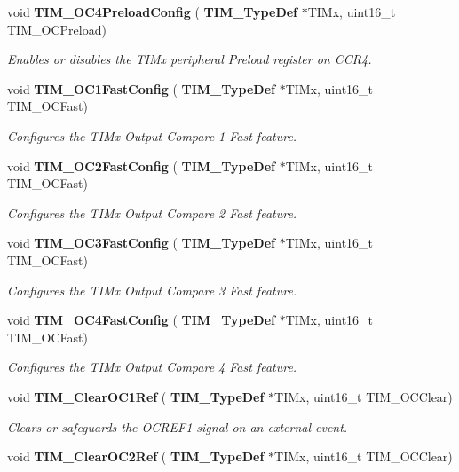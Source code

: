 \begin{DoxyCompactItemize}
void \textbf{ T\+I\+M\+\_\+\+O\+C4\+Preload\+Config} (\textbf{ T\+I\+M\+\_\+\+Type\+Def} $\ast$T\+I\+Mx, uint16\+\_\+t T\+I\+M\+\_\+\+O\+C\+Preload)
\begin{DoxyCompactList}\small\item\em Enables or disables the T\+I\+Mx peripheral Preload register on C\+C\+R4. \end{DoxyCompactList}\item 
void \textbf{ T\+I\+M\+\_\+\+O\+C1\+Fast\+Config} (\textbf{ T\+I\+M\+\_\+\+Type\+Def} $\ast$T\+I\+Mx, uint16\+\_\+t T\+I\+M\+\_\+\+O\+C\+Fast)
\begin{DoxyCompactList}\small\item\em Configures the T\+I\+Mx Output Compare 1 Fast feature. \end{DoxyCompactList}\item 
void \textbf{ T\+I\+M\+\_\+\+O\+C2\+Fast\+Config} (\textbf{ T\+I\+M\+\_\+\+Type\+Def} $\ast$T\+I\+Mx, uint16\+\_\+t T\+I\+M\+\_\+\+O\+C\+Fast)
\begin{DoxyCompactList}\small\item\em Configures the T\+I\+Mx Output Compare 2 Fast feature. \end{DoxyCompactList}\item 
void \textbf{ T\+I\+M\+\_\+\+O\+C3\+Fast\+Config} (\textbf{ T\+I\+M\+\_\+\+Type\+Def} $\ast$T\+I\+Mx, uint16\+\_\+t T\+I\+M\+\_\+\+O\+C\+Fast)
\begin{DoxyCompactList}\small\item\em Configures the T\+I\+Mx Output Compare 3 Fast feature. \end{DoxyCompactList}\item 
void \textbf{ T\+I\+M\+\_\+\+O\+C4\+Fast\+Config} (\textbf{ T\+I\+M\+\_\+\+Type\+Def} $\ast$T\+I\+Mx, uint16\+\_\+t T\+I\+M\+\_\+\+O\+C\+Fast)
\begin{DoxyCompactList}\small\item\em Configures the T\+I\+Mx Output Compare 4 Fast feature. \end{DoxyCompactList}\item 
void \textbf{ T\+I\+M\+\_\+\+Clear\+O\+C1\+Ref} (\textbf{ T\+I\+M\+\_\+\+Type\+Def} $\ast$T\+I\+Mx, uint16\+\_\+t T\+I\+M\+\_\+\+O\+C\+Clear)
\begin{DoxyCompactList}\small\item\em Clears or safeguards the O\+C\+R\+E\+F1 signal on an external event. \end{DoxyCompactList}\item 
void \textbf{ T\+I\+M\+\_\+\+Clear\+O\+C2\+Ref} (\textbf{ T\+I\+M\+\_\+\+Type\+Def} $\ast$T\+I\+Mx, uint16\+\_\+t T\+I\+M\+\_\+\+O\+C\+Clear)

\end{DoxyCompactItemize}
